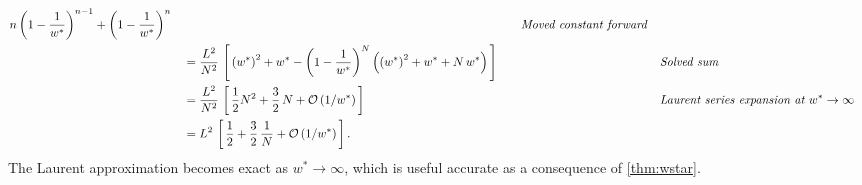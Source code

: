 \begin{proofEnd}
\begin{alignat}{2}
      n \, {\left(1 - \frac{1}{w^*}\right)}^{n-1}
      +
      {\left(1 - \frac{1}{w^*}\right)}^{n} 
    \nonumber
    &&\quad\text{\textit{Moved constant forward}}
    \\
    &\quad=
    \frac{L^2}{N^2} \,
    \left[\,
      {\left(w^*\right)}^2 + w^*
      -
      {\left(1 - \frac{1}{w^*}\right)}^N
      \left(
        {\left(w^*\right)}^2 + w^* + N\,w^*
      \right)
    \,\right]
    \nonumber
    &&\quad\text{\textit{Solved sum}}
    \\
    &\quad=
    \frac{L^2}{N^2} \,
    \left[\,
    \frac{1}{2} N^2 + \frac{3}{2}\,N 
    + \mathcal{O}\left(1/w^*\right)
    \,\right]
    \nonumber
    &&\quad\text{\textit{Laurent series expansion at \(w^* \rightarrow \infty\)}}
    \\
    &\quad=
    L^2 \,
    \left[\,
    \frac{1}{2} + \frac{3}{2}\,\frac{1}{N}
    + \mathcal{O}\left(1/w^*\right)
    \,\right].
    \nonumber
  \end{alignat}
  The Laurent approximation becomes exact as \(w^* \rightarrow \infty\), which is useful accurate as a consequence of \cref{thm:wstar}.
\end{proofEnd}

